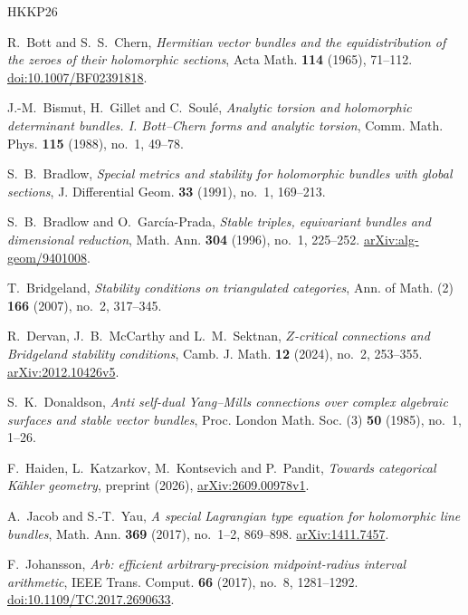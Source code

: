 \begin{thebibliography}{HKKP26}

R.~Bott and S.~S.~Chern,
\textit{Hermitian vector bundles and the equidistribution of the zeroes of
their holomorphic sections},
Acta Math. \textbf{114} (1965), 71--112.
\href{https://doi.org/10.1007/BF02391818}{doi:10.1007/BF02391818}.

J.-M.~Bismut, H.~Gillet and C.~Soul\'e,
\textit{Analytic torsion and holomorphic determinant bundles. I. Bott--Chern
forms and analytic torsion},
Comm. Math. Phys. \textbf{115} (1988), no.~1, 49--78.

S.~B.~Bradlow,
\textit{Special metrics and stability for holomorphic bundles with global
sections},
J. Differential Geom. \textbf{33} (1991), no.~1, 169--213.

S.~B.~Bradlow and O.~Garc\'ia-Prada,
\textit{Stable triples, equivariant bundles and dimensional reduction},
Math. Ann. \textbf{304} (1996), no.~1, 225--252.
\href{https://arxiv.org/abs/alg-geom/9401008}{arXiv:alg-geom/9401008}.

T.~Bridgeland,
\textit{Stability conditions on triangulated categories},
Ann. of Math. (2) \textbf{166} (2007), no.~2, 317--345.

R.~Dervan, J.~B.~McCarthy and L.~M.~Sektnan,
\textit{$Z$-critical connections and Bridgeland stability conditions},
Camb. J. Math. \textbf{12} (2024), no.~2, 253--355.
\href{https://arxiv.org/abs/2012.10426v5}{arXiv:2012.10426v5}.

S.~K.~Donaldson,
\textit{Anti self-dual Yang--Mills connections over complex algebraic
surfaces and stable vector bundles},
Proc. London Math. Soc. (3) \textbf{50} (1985), no.~1, 1--26.

F.~Haiden, L.~Katzarkov, M.~Kontsevich and P.~Pandit,
\textit{Towards categorical K\"ahler geometry},
preprint (2026), \href{https://arxiv.org/abs/2609.00978v1}{arXiv:2609.00978v1}.

A.~Jacob and S.-T.~Yau,
\textit{A special Lagrangian type equation for holomorphic line bundles},
Math. Ann. \textbf{369} (2017), no.~1--2, 869--898.
\href{https://arxiv.org/abs/1411.7457}{arXiv:1411.7457}.

F.~Johansson,
\textit{Arb: efficient arbitrary-precision midpoint-radius interval
arithmetic},
IEEE Trans. Comput. \textbf{66} (2017), no.~8, 1281--1292.
\href{https://doi.org/10.1109/TC.2017.2690633}{doi:10.1109/TC.2017.2690633}.


\end{thebibliography}
